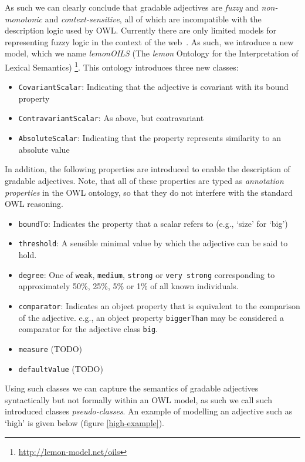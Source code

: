 \documentclass[11pt]{article}
\begin{document}
As such we can clearly conclude that gradable adjectives are \emph{fuzzy} and
\emph{non-monotonic} and \emph{context-sensitive}, all of which are incompatible 
with the description logic
used by OWL. Currently there are only limited models for representing fuzzy 
logic in the context of the web~\cite{zhao2008uncertainty}. As such, we 
introduce a new model, which we name \emph{lemonOILS} (The \emph{lemon} 
Ontology for the Interpretation of Lexical Semantics)
\footnote{\url{http://lemon-model.net/oils}}. This ontology introduces three 
new classes:

\begin{itemize}
	\item {\tt CovariantScalar}: Indicating that the adjective is covariant with its bound property
	\item {\tt ContravariantScalar}: As above, but contravariant
	\item {\tt AbsoluteScalar}: Indicating that the property represents similarity to an absolute value
\end{itemize}

In addition, the following properties are introduced to enable the description 
of gradable adjectives. Note, that all of these properties are typed as 
\emph{annotation properties} in the OWL ontology, so that they do not interfere 
with the standard OWL reasoning.

\begin{itemize}
	\item {\tt boundTo}: Indicates the property that a scalar refers to (e.g., `size' for `big')
	\item {\tt threshold}: A sensible minimal value by which the adjective can be said to hold.
	\item {\tt degree}: One of {\tt weak}, {\tt medium}, {\tt strong} or {\tt very strong} corresponding to approximately 50\%, 25\%, 5\% or 1\% of all known individuals.
	\item {\tt comparator}: Indicates an object property that is equivalent to the comparison of the adjective. e.g., an object property {\tt biggerThan} may be considered a comparator for the adjective class {\tt big}.
	\item {\tt measure} (TODO)
	\item {\tt defaultValue} (TODO)
\end{itemize}

Using such classes we can capture the semantics of gradable adjectives 
syntactically but not formally within an OWL model, as such we call such 
introduced classes \emph{pseudo-classes}. An example of modelling an adjective 
such as `high' is given below (figure \ref{high-example}).
\end{document}
